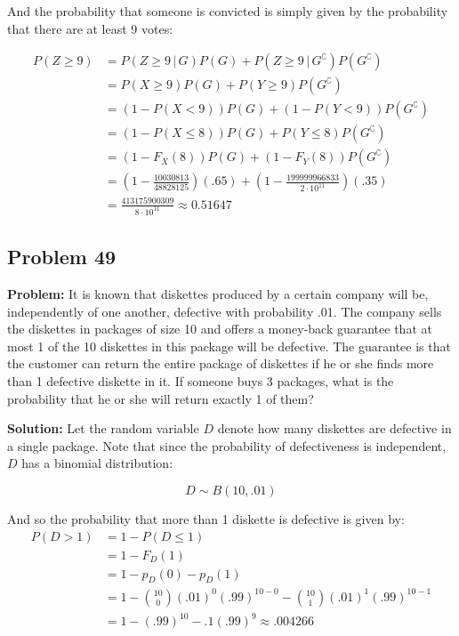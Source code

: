 \documentclass{article}
\newcommand*\pbar[0]{\,|\,}
\begin{document}
And the probability that someone is convicted is simply given by the probability that there are at least 9 votes:

\begin{align*}
    P(Z\ge9)&=P(Z\ge 9\pbar G)P(G)+P(Z\ge9\pbar G^\complement)P(G^\complement)\\
    &=P(X\ge 9)P(G)+P(Y\ge9)P(G^\complement)\tag{def. of $X$ and $Y$}\\
    &=(1-P(X<9))P(G)+(1-P(Y<9))P(G^\complement)\tag{complement}\\
    &=(1-P(X\le 8))P(G)+P(Y\le 8)P(G^\complement)\tag{discrete random variable}\\
    &=(1-F_X(8))P(G)+(1-F_Y(8))P(G^\complement)\tag{def. of cdf}\\
    &=\left(1-\frac{10030813}{48828125}\right)(.65)+\left(1-\frac{199999966833}{2\cdot10^{11}}\right)(.35)\\
    &=\frac{413175900309}{8\cdot10^{11}}\approx 0.51647
\end{align*}

\subsection*{Problem 49}
\noindent\textbf{Problem:} It is known that diskettes produced by a certain company will be, independently of one another, defective with probability .01. The company sells the diskettes in packages of size 10 and offers a money-back guarantee that at most 1 of the 10 diskettes in this package will be defective. The guarantee is that the customer can return the entire package of diskettes if he or she finds more than 1 defective diskette in it. If someone buys 3 packages, what is the probability that he or she will return exactly 1 of them?
\bigskip

\noindent\textbf{Solution:} Let the random variable $D$ denote how many diskettes are defective in a single package. Note that since the probability of defectiveness is independent, $D$ has a binomial distribution:

\begin{equation*}
    D\sim B(10,.01)
\end{equation*}

And so the probability that more than 1 diskette is defective is given by:
\begin{align*}
    P(D>1)&=1-P(D\le 1)\tag{complement}\\
    &=1-F_D(1)\tag{def. of cdf}\\
    &=1-p_D(0)-p_D(1)\tag{def. of pmf}\\
    &=1-\binom{10}{0}(.01)^0(.99)^{10-0}-\binom{10}{1}(.01)^1(.99)^{10-1}\tag{binomial distribution}\\
    &=1-(.99)^{10}-.1(.99)^9\approx.004266\\
\end{align*}
\end{document}
